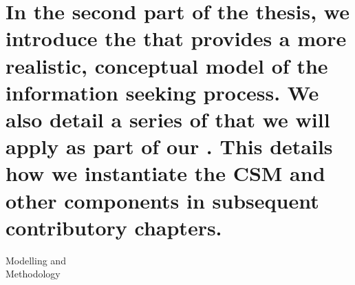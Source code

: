 
\part[Modelling and Methodology]{In the second part of the thesis, we introduce the  that provides a more realistic, conceptual model of the information seeking process. We also detail a series of  that we will apply as part of our . This details how we instantiate the CSM and other components in subsequent contributory chapters.}{Modelling and\\Methodology}\label{part:stopping}